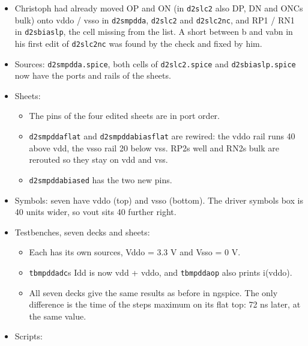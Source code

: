 \documentclass[11pt,a4paper]{article}
\providecommand{\tightlist}{\setlength{\itemsep}{0pt}\setlength{\parskip}{0pt}}
\renewcommand{\_}{\textunderscore\hspace{0pt}}
\begin{document}
\begin{itemize}
\tightlist
\item
  Christoph had already moved OP and ON (in
  \texttt{d2s\_lc2} also DP, DN and
  ONC\textquotesingle s bulk) onto vddo / vsso in
  \texttt{d2s\_mpdda}, \texttt{d2s\_lc2} and
  \texttt{d2s\_lc2\_nc}, and RP1 / RN1 in
  \texttt{d2s\_bias\_lp}, the cell missing from
  the list. A short between b and vabn in his
  first edit of \texttt{d2s\_lc2\_nc} was found by
  the check and fixed by him.
\item
  Sources: \texttt{d2s\_mpdda.spice}, both cells
  of \texttt{d2s\_lc2.spice} and
  \texttt{d2s\_bias\_lp.spice} now have the ports
  and rails of the sheets.
\item
  Sheets:

  \begin{itemize}
  \tightlist
  \item
    The pins of the four edited sheets are in port
    order.
  \item
    \texttt{d2s\_mpdda\_flat} and
    \texttt{d2s\_mpdda\_bias\_flat} are rewired:
    the vddo rail runs 40 above vdd, the vsso rail
    20 below vss. RP2\textquotesingle s well and
    RN2\textquotesingle s bulk are rerouted so
    they stay on vdd and vss.
  \item
    \texttt{d2s\_mpdda\_biased} has the two new
    pins.
  \end{itemize}
\item
  Symbols: seven have vddo (top) and vsso
  (bottom). The driver symbols\textquotesingle{}
  box is 40 units wider, so vout sits 40 further
  right.
\item
  Testbenches, seven decks and sheets:

  \begin{itemize}
  \tightlist
  \item
    Each has its own sources, Vddo = 3.3 V and
    Vsso = 0 V.
  \item
    \texttt{tb\_mpdda\_dc}\textquotesingle s Idd
    is now vdd + vddo, and \texttt{tb\_mpdda\_op}
    also prints i(vddo).
  \item
    All seven decks give the same results as
    before in ngspice. The only difference is the
    time of the step\textquotesingle s maximum on
    its flat top: 72 ns later, at the same value.
  \end{itemize}
\item
  Scripts:


\end{itemize}
\end{document}
